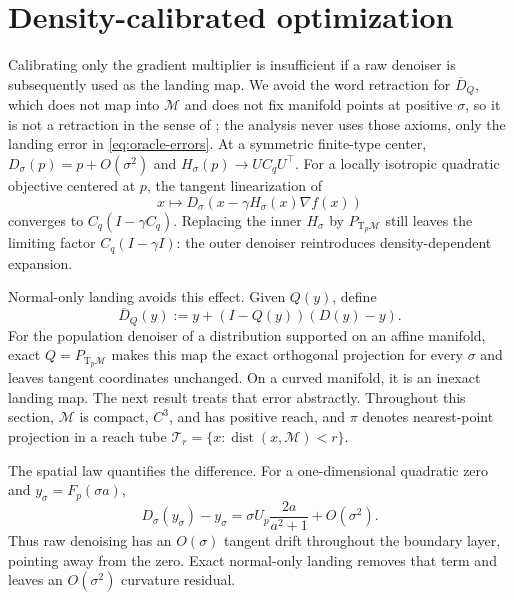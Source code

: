 \documentclass[10pt]{article}
\theoremstyle{c2fup}
\newcommand{\M}{\mathcal{M}}
\newcommand{\T}{\mathrm{T}}
\newcommand{\dist}{\operatorname{dist}}
\begin{document}
\section{Density-calibrated optimization}
\label{sec:optimization}

Calibrating only the gradient multiplier is insufficient if a raw denoiser is subsequently used as the landing map.  We avoid the word retraction for $\overline D_Q$, which does not map into $\M$ and does not fix manifold points at positive $\sigma$, so it is not a retraction in the sense of \citet{absil2008optimization}; the analysis never uses those axioms, only the landing error in \eqref{eq:oracle-errors}.  At a symmetric finite-type center,
$D_\sigma(p)=p+O(\sigma^2)$ and $H_\sigma(p)\to U C_qU^\top$.  For a locally isotropic quadratic objective centered at $p$, the tangent linearization of
\begin{equation}
  x\longmapsto D_\sigma\!\left(x-\gamma H_\sigma(x)\nabla f(x)\right)
  \label{eq:raw-drgd}
\end{equation}
converges to $C_q(I-\gamma C_q)$.  Replacing the inner $H_\sigma$ by $P_{\T_p\M}$ still leaves the limiting factor $C_q(I-\gamma I)$: the outer denoiser reintroduces density-dependent expansion.

Normal-only landing avoids this effect.  Given $Q(y)$, define
\begin{equation}
  \overline D_Q(y):=y+(I-Q(y))(D(y)-y).
  \label{eq:normal-landing}
\end{equation}
For the population denoiser of a distribution supported on an affine manifold, exact $Q=P_{\T_p\M}$ makes this map the exact orthogonal projection for every $\sigma$ and leaves tangent coordinates unchanged.  On a curved manifold, it is an inexact landing map.  The next result treats that error abstractly.  Throughout this section, $\M$ is compact, $C^3$, and has positive reach, and $\pi$ denotes nearest-point projection in a reach tube $\mathcal{T}_r=\{x:\dist(x,\M)<r\}$.

The spatial law quantifies the difference.  For a one-dimensional quadratic zero and $y_\sigma=F_p(\sigma a)$,
\begin{equation}
  D_\sigma(y_\sigma)-y_\sigma
  =\sigma U_p\frac{2a}{a^2+1}+O(\sigma^2).
  \label{eq:tangent-drift}
\end{equation}
Thus raw denoising has an $O(\sigma)$ tangent drift throughout the boundary layer, pointing away from the zero.  Exact normal-only landing removes that term and leaves an $O(\sigma^2)$ curvature residual.
\end{document}
